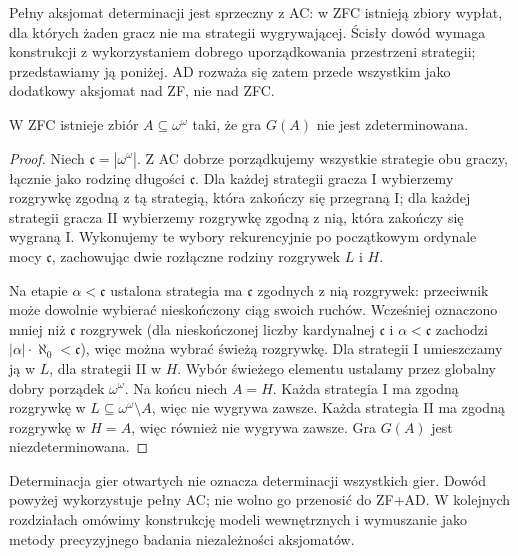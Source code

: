 \begin{uwaga}\label{rem:ad-ac-incompat}
Pełny aksjomat determinacji jest sprzeczny z AC: w ZFC istnieją zbiory wypłat, dla których żaden gracz nie ma strategii wygrywającej. Ścisły dowód wymaga konstrukcji z wykorzystaniem dobrego uporządkowania przestrzeni strategii; przedstawiamy ją poniżej. AD rozważa się zatem przede wszystkim jako dodatkowy aksjomat nad ZF, nie nad ZFC.
\end{uwaga}
\begin{twierdzenie}\label{thm:ac-not-ad}
W ZFC istnieje zbiór $A\subseteq\omega^\omega$ taki, że gra $G(A)$ nie jest zdeterminowana.
\end{twierdzenie}
\begin{proof}
Niech $\mathfrak c=|\omega^\omega|$. Z AC dobrze porządkujemy wszystkie strategie obu graczy, łącznie jako rodzinę długości $\mathfrak c$. Dla każdej strategii gracza I wybierzemy rozgrywkę zgodną z tą strategią, która zakończy się przegraną I; dla każdej strategii gracza II wybierzemy rozgrywkę zgodną z nią, która zakończy się wygraną I. Wykonujemy te wybory rekurencyjnie po początkowym ordynale mocy $\mathfrak c$, zachowując dwie rozłączne rodziny rozgrywek $L$ i $H$.

Na etapie $\alpha<\mathfrak c$ ustalona strategia ma $\mathfrak c$ zgodnych z nią rozgrywek: przeciwnik może dowolnie wybierać nieskończony ciąg swoich ruchów. Wcześniej oznaczono mniej niż $\mathfrak c$ rozgrywek (dla nieskończonej liczby kardynalnej $\mathfrak c$ i $\alpha<\mathfrak c$ zachodzi $|\alpha|\cdot\aleph_0<\mathfrak c$), więc można wybrać świeżą rozgrywkę. Dla strategii I umieszczamy ją w $L$, dla strategii II w $H$. Wybór świeżego elementu ustalamy przez globalny dobry porządek $\omega^\omega$. Na końcu niech $A=H$. Każda strategia I ma zgodną rozgrywkę w $L\subseteq\omega^\omega\setminus A$, więc nie wygrywa zawsze. Każda strategia II ma zgodną rozgrywkę w $H=A$, więc również nie wygrywa zawsze. Gra $G(A)$ jest niezdeterminowana.
\end{proof}
\begin{uwaga}
Determinacja gier otwartych nie oznacza determinacji wszystkich gier. Dowód powyżej wykorzystuje pełny AC; nie wolno go przenosić do ZF+AD. W kolejnych rozdziałach omówimy konstrukcję modeli wewnętrznych i wymuszanie jako metody precyzyjnego badania niezależności aksjomatów.
\end{uwaga}

